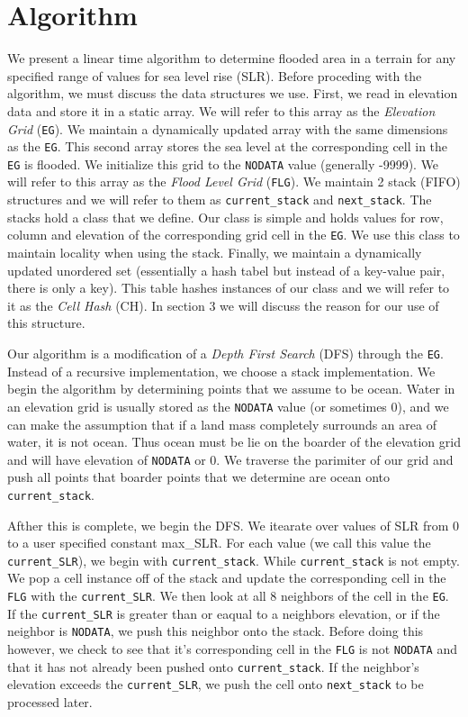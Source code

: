 \documentclass[]{scrartcl}
\begin{document}
\section{Algorithm}
\indent \indent We present a linear time algorithm to determine flooded area in a terrain for any specified range of values for sea level rise (SLR). Before proceding with the algorithm, we must discuss the data structures we use. First, we read in elevation data and store it in a static array. We will refer to this array as the {\em Elevation Grid} (\texttt{EG}). We maintain a dynamically updated array with the same dimensions as the \texttt{EG}. This second array stores the sea level at the corresponding cell in the \texttt{EG} is flooded. We initialize this grid to the \texttt{NODATA} value (generally -9999). We will refer to this array as the {\em Flood Level Grid} (\texttt{FLG}). We maintain 2 stack (FIFO) structures and we will refer to them as \texttt{current\_stack} and \texttt{next\_stack}. The stacks hold a class that we define. Our class is simple and holds values for row, column and elevation of the corresponding grid cell in the \texttt{EG}. We use this class to maintain locality when using the stack. Finally, we maintain a dynamically updated unordered set (essentially a hash tabel but instead of a key-value pair, there is only a key). This table hashes instances of our class and we will refer to it as the {\em Cell Hash} (CH). In section 3 we will discuss the reason for our use of this structure. \par
\indent Our algorithm is a modification of a {\em Depth First Search} (DFS) through the \texttt{EG}. Instead of a recursive implementation, we choose a stack implementation. We begin the algorithm by determining points that we assume to be ocean. Water in an elevation grid is usually stored as the \texttt{NODATA} value (or sometimes 0), and we can make the assumption that if a land mass completely surrounds an area of water, it is not ocean. Thus ocean must be lie on the boarder of the elevation grid and will have elevation of \texttt{NODATA} or 0. We traverse the parimiter of our grid and push all points that boarder points that we determine are ocean onto \texttt{current\_stack}.\par
\indent Afther this is complete, we begin the DFS. We itearate over values of SLR from 0 to a user specified constant max\_SLR. For each value (we call this value the \texttt{current\_SLR}), we begin with \texttt{current\_stack}. While \texttt{current\_stack} is not empty. We pop a cell instance off of the stack and update the corresponding cell in the \texttt{FLG} with the \texttt{current\_SLR}. We then look at all 8 neighbors of the cell in the \texttt{EG}. If the \texttt{current\_SLR} is greater than or eaqual to a neighbors elevation, or if the neighbor is \texttt{NODATA}, we push this neighbor onto the stack. Before doing this however, we check to see that it's corresponding cell in the \texttt{FLG} is not \texttt{NODATA} and that it has not already been pushed onto \texttt{current\_stack}. If the neighbor's elevation exceeds the \texttt{current\_SLR}, we push the cell onto \texttt{next\_stack} to be processed later. \par
\end{document}
